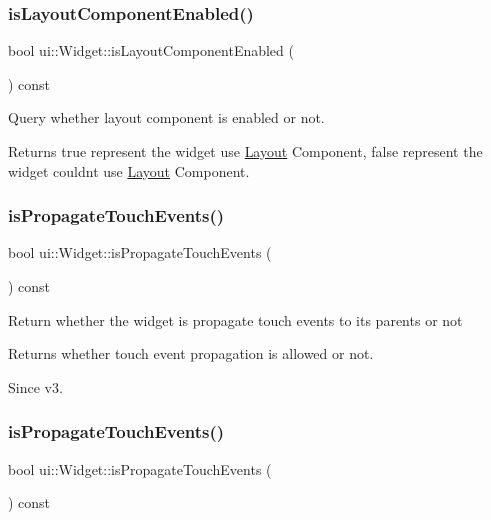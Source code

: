\subsubsection{\texorpdfstring{is\+Layout\+Component\+Enabled()}{isLayoutComponentEnabled()}\hspace{0.1cm}{\footnotesize\ttfamily [2/2]}}
{\footnotesize\ttfamily bool ui\+::\+Widget\+::is\+Layout\+Component\+Enabled (\begin{DoxyParamCaption}{ }\end{DoxyParamCaption}) const}

Query whether layout component is enabled or not. \begin{DoxyReturn}{Returns}
true represent the widget use \hyperlink{classui_1_1Layout}{Layout} Component, false represent the widget couldn\textquotesingle{}t use \hyperlink{classui_1_1Layout}{Layout} Component. 
\end{DoxyReturn}
\mbox{\label{classui_1_1Widget_ad4aaaf33aa2d6d06df5a50c4c50971e0}} 
\subsubsection{\texorpdfstring{is\+Propagate\+Touch\+Events()}{isPropagateTouchEvents()}\hspace{0.1cm}{\footnotesize\ttfamily [1/2]}}
{\footnotesize\ttfamily bool ui\+::\+Widget\+::is\+Propagate\+Touch\+Events (\begin{DoxyParamCaption}{ }\end{DoxyParamCaption}) const}

Return whether the widget is propagate touch events to its parents or not \begin{DoxyReturn}{Returns}
whether touch event propagation is allowed or not. 
\end{DoxyReturn}
\begin{DoxySince}{Since}
v3. 
\end{DoxySince}
\mbox{\label{classui_1_1Widget_ad4aaaf33aa2d6d06df5a50c4c50971e0}} 
\subsubsection{\texorpdfstring{is\+Propagate\+Touch\+Events()}{isPropagateTouchEvents()}\hspace{0.1cm}{\footnotesize\ttfamily [2/2]}}
{\footnotesize\ttfamily bool ui\+::\+Widget\+::is\+Propagate\+Touch\+Events (\begin{DoxyParamCaption}{ }\end{DoxyParamCaption}) const}


